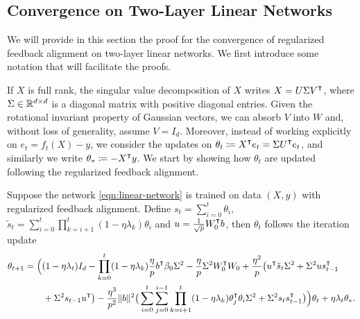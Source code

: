 \subsection{Convergence on Two-Layer Linear Networks}

We will provide in this section the proof for the convergence of regularized feedback alignment on two-layer linear networks. We first introduce some notation that will facilitate the proofs.

If $X$ is full rank, the singular value decomposition of $X$ writes $X = U\Sigma V\transpose$, where $\Sigma \in \mathbb{R}^{d\times d}$ is a diagonal matrix with positive diagonal entries. Given the rotational invariant property of Gaussian vectors, we can absorb $V$ into $W$ and, without loss of generality, assume $V = I_d$. 
Moreover, instead of working explicitly on $e_t = f_t(X) - y$, we consider the updates on $\theta_t \defeq X\transpose e_t = \Sigma U\transpose e_t$, and similarly we write $\theta_\ast \defeq -X\transpose y$. We start by showing how $\theta_t$ are updated following the regularized feedback alignment.

\begin{lemma}\label{lem:theta-updates}
    Suppose the network \eqref{eqn:linear-network} is trained on data $(X,y)$ with regularized feedback alignment. Define $s_{t} = \sum_{i=0}^{t} \theta_i$, $\tilde s_{t} = \sum_{i=0}^{t} \prod_{k=i+1}^t (1-\eta\lambda_k)\theta_i$ and $u = \frac{1}{\sqrt{p}} W_0\transpose b$, then $\theta_t$ follows the iteration update
    \begin{align}\label{eqn:theta-tlam-ordinary}
        \begin{split}
            \theta_{t+1} & = \Big((1-\eta\lambda_t)I_d - \prod_{k=0}^t(1-\eta\lambda_k)\frac{\eta}{p}b\transpose\beta_0 \Sigma^2 - \frac{\eta}{p}\Sigma^2 W_0\transpose W_0 + \frac{\eta^2}{p}\big(u\transpose \tilde{s}_t \Sigma^2 + \Sigma^2 u s_{t-1}\transpose \\
            & \qquad + \Sigma^2 s_{t-1}u\transpose\big) - \frac{\eta^3}{p^2}\|b\|^2\big(\sum_{i=0}^t\sum_{j=0}^{i-1} \prod_{k=i+1}^t(1-\eta\lambda_k)\theta_j\transpose \theta_i \Sigma^2 + \Sigma^2 s_ts_{t-1}\transpose \big) \Big)\theta_t + \eta\lambda_t \theta_\ast.
        \end{split}
    \end{align}
\end{lemma}

